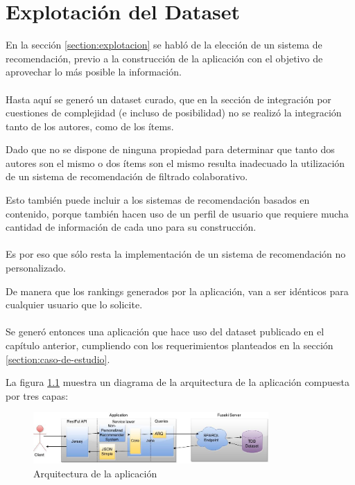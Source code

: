 \chapter{Explotación del Dataset}
\label{chapter:explotacion}

En la sección \ref{section:explotacion} se habló de la elección de un sistema de recomendación, previo 
a la construcción de la aplicación con el objetivo de aprovechar lo más posible la información.\\
\\
Hasta aquí se generó un dataset curado, que en la sección de integración por cuestiones de complejidad 
(e incluso de posibilidad) no se realizó la integración tanto de los autores, como de los ítems.

Dado que no se dispone de ninguna propiedad para determinar que tanto dos autores son el mismo o dos ítems son el mismo 
resulta inadecuado la utilización de un sistema de recomendación de filtrado colaborativo.

Esto también puede incluir a los sistemas de recomendación basados en contenido, porque también hacen uso de 
un perfil de usuario que requiere mucha cantidad de información de cada uno para su construcción.
\\\\
Es por eso que sólo resta la implementación de un sistema de recomendación no personalizado.

De manera que los rankings generados por la aplicación, van a ser idénticos para cualquier 
usuario que lo solicite.
\\\\
Se generó entonces una aplicación que hace uso del dataset publicado en el capítulo anterior, 
cumpliendo con los requerimientos planteados en la sección \ref{section:caso-de-estudio}.

La figura \ref{figure:explotacion} muestra un diagrama de la arquitectura de la aplicación compuesta por tres capas:

\begin{figure}
    \centering
    \includegraphics[width=0.8\textwidth,natwidth=610,natheight=642]{explotacion}
    \caption{Arquitectura de la aplicación}
    \label{figure:explotacion}
\end{figure}

